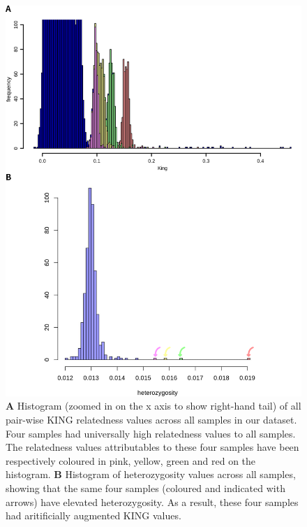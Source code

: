 \documentclass[a4paper,12pt]{article}
\begin{document}
\clearpage


\begin{figure}[h]
	\begin{center}
		\includegraphics*[width = 15cm]{odd_samples.png}
		\caption{\footnotesize \textbf{A} Histogram (zoomed in on the x axis to show right-hand tail) of all pair-wise KING relatedness values across all samples in our dataset. Four samples had universally high relatedness values to all samples. The relatedness values attributables to these four samples have been respectively coloured in pink, yellow, green and red on the histogram. \textbf{B} Histogram of heterozygosity values across all samples, showing that the same four samples (coloured and indicated with arrows) have elevated heterozygosity. As a result, these four samples had aritificially augmented KING values.}
	\end{center}
	\label{FigS2}
\end{figure}


\clearpage
\end{document}

